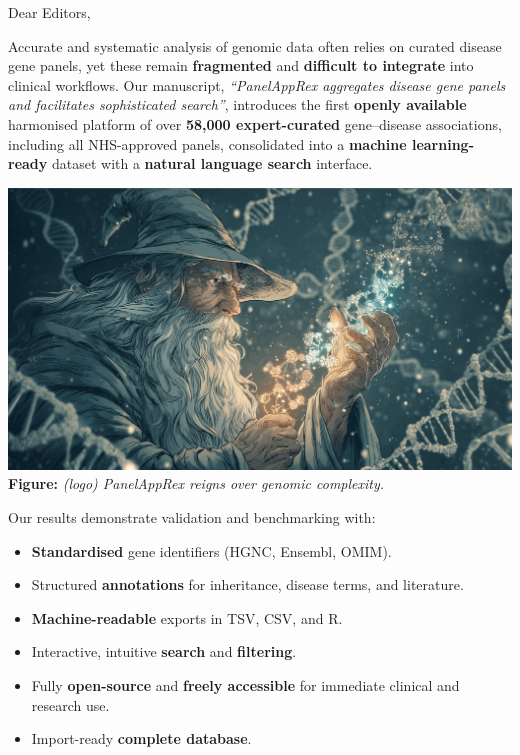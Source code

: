 \documentclass[12pt,a4paper]{letter}
\begin{document}
 

\begin{letter}{Dear Editors,}

\opening{}

Accurate and systematic analysis of genomic data often relies on curated disease gene panels, yet these remain \textbf{fragmented} and \textbf{difficult to integrate} into clinical workflows. Our manuscript, \textit{``PanelAppRex aggregates disease gene panels and facilitates sophisticated search''}, introduces the first \textbf{openly available} harmonised platform of over \textbf{58,000 expert-curated} gene–disease associations, including all NHS-approved panels, consolidated into a \textbf{machine learning-ready} dataset with a \textbf{natural language search} interface.

\begin{center}
\includegraphics[width=\linewidth]{../images/panelapprex_logo_v2_16x9.png}
\noindent
\textbf{Figure:}\textit{ (logo) PanelAppRex reigns over genomic complexity.}
\bigskip
\end{center}

Our results demonstrate validation and benchmarking with:
\begin{itemize}
\item \textbf{Standardised} gene identifiers (HGNC, Ensembl, OMIM).
\item Structured \textbf{annotations} for inheritance, disease terms, and literature.
\item \textbf{Machine-readable} exports in TSV, CSV, and R.
\item Interactive, intuitive \textbf{search} and \textbf{filtering}.
\item Fully \textbf{open-source} and \textbf{freely accessible} for immediate clinical and research use.
\item Import-ready \textbf{complete database}.
\end{itemize}


\end{letter}
\end{document}
